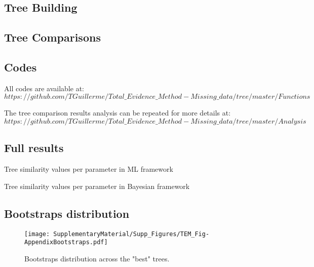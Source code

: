 \subsection{Tree Building}
  
  \label{Supp_TreeBuilding}

\subsection{Tree Comparisons}
  
  \label{Supp_TreeComparison}

\subsection{Codes}
All codes are available at: $https://github.com/TGuillerme/Total\_Evidence\_Method-Missing\_data/tree/master/Functions$

The tree comparison results analysis can be repeated for more details at: $https://github.com/TGuillerme/Total\_Evidence\_Method-Missing\_data/tree/master/Analysis$ %

\subsection{Full results}

\begin{table}
  \caption{Tree similarity values per parameter in ML framework}
  \centering
  
  \label{NTSML_full}
\end{table}

\begin{table}
  \caption{Tree similarity values per parameter in Bayesian framework}
  \centering
  
  \label{NTSBA_full}
\end{table}

\subsection{Bootstraps distribution}

\begin{figure}
  \centering
  \texttt{[image: SupplementaryMaterial/Supp\_Figures/TEM\_Fig-AppendixBootstraps.pdf]}
  \caption{Bootstraps distribution across the "best" trees.}                     %
  \label{Fig_AppendixBoostraps}
\end{figure}
